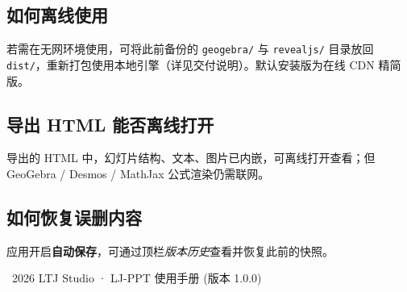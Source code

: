 \documentclass[12pt,a4paper]{ctexart}
\begin{document}
\subsection{如何离线使用}
若需在无网环境使用，可将此前备份的 \texttt{geogebra/} 与 \texttt{revealjs/} 目录放回 \texttt{dist/}，重新打包使用本地引擎（详见交付说明）。默认安装版为在线 CDN 精简版。

\subsection{导出 HTML 能否离线打开}
导出的 HTML 中，幻灯片结构、文本、图片已内嵌，可离线打开查看；但 GeoGebra / Desmos / MathJax 公式渲染仍需联网。

\subsection{如何恢复误删内容}
应用开启\textbf{自动保存}，可通过顶栏\emph{版本历史}查看并恢复此前的快照。

\vfill
\begin{center}
\color{gray}\small\textcopyright\ 2026 LTJ Studio · LJ-PPT 使用手册 \quad(版本 1.0.0)
\end{center}
\end{document}
